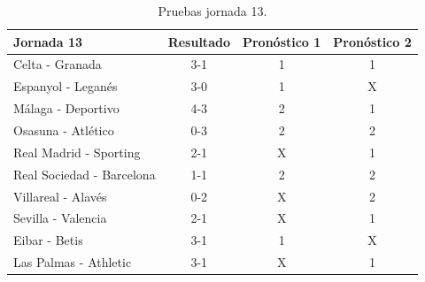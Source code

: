  \begin{table}
  \begin{center}
    \centering
    \begin{tabular}{p{5cm} c c c }
    \toprule
   	Jornada 13 & Resultado & Pronóstico 1 & Pronóstico 2\\
   	\midrule
    Celta - Granada & 3-1 & \cellcolor{green!30}1 & \cellcolor{green!30}1\\
    Espanyol - Leganés & 3-0 & \cellcolor{green!30}1 & \cellcolor{red!30}X\\    
    Málaga - Deportivo & 4-3 & \cellcolor{red!30}2 & \cellcolor{green!30}1\\    
    Osasuna - Atlético & 0-3 & \cellcolor{green!30}2 & \cellcolor{green!30}2\\    
    Real Madrid - Sporting & 2-1 & \cellcolor{red!30}X & \cellcolor{green!30}1\\    
    Real Sociedad - Barcelona & 1-1 & \cellcolor{red!30}2 & \cellcolor{red!30}2\\    
    Villareal - Alavés & 0-2 & \cellcolor{red!30}X & \cellcolor{green!30}2\\    
	Sevilla - Valencia & 2-1 & \cellcolor{red!30}X & \cellcolor{green!30}1\\    
	Eibar - Betis & 3-1 & \cellcolor{green!30}1 & \cellcolor{red!30}X\\    
    Las Palmas - Athletic & 3-1 & \cellcolor{red!30}X & \cellcolor{green!30}1\\
    \bottomrule    
   \end{tabular}
   \caption{Pruebas jornada 13.}
   \label{tabla:jornada13}
  \end{center}
 \end{table} 
 
